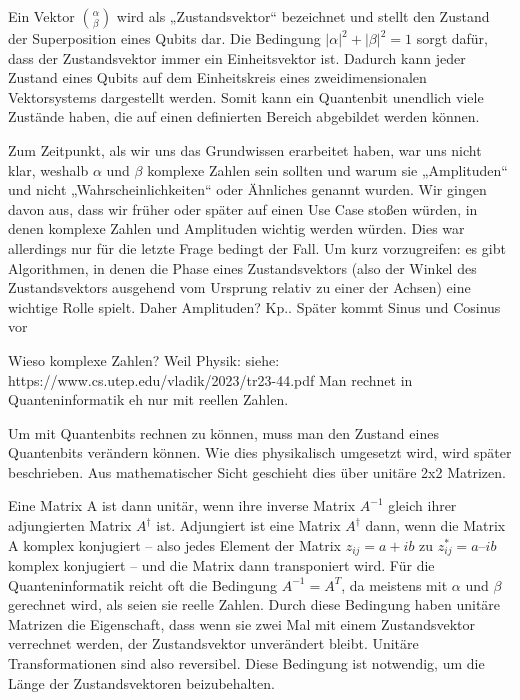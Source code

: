 Ein Vektor $\binom{\alpha}{\beta}$ wird als „Zustandsvektor“ bezeichnet und stellt den Zustand der Superposition eines Qubits dar. Die Bedingung $\left|\alpha\right|^2+\left|\beta\right|^2=1$ sorgt dafür, dass der Zustandsvektor immer ein Einheitsvektor ist. Dadurch kann jeder Zustand eines Qubits auf dem Einheitskreis eines zweidimensionalen Vektorsystems dargestellt werden. Somit kann ein Quantenbit unendlich viele Zustände haben, die auf einen definierten Bereich abgebildet werden können. 

\begin{tcolorbox}[title=Kommentar,
    title filled=false,
    colback=cyan!5!white,
    colframe=cyan!75!black]
Zum Zeitpunkt, als wir uns das Grundwissen erarbeitet haben, war uns nicht klar, weshalb $\alpha$ und $\beta$ komplexe Zahlen sein sollten und warum sie „Amplituden“ und nicht „Wahrscheinlichkeiten“ oder Ähnliches genannt wurden. Wir gingen davon aus, dass wir früher oder später auf einen Use Case stoßen würden, in denen komplexe Zahlen und Amplituden wichtig werden würden. Dies war allerdings nur für die letzte Frage bedingt der Fall. Um kurz vorzugreifen: es gibt Algorithmen, in denen die Phase eines Zustandsvektors (also der Winkel des Zustandsvektors ausgehend vom Ursprung relativ zu einer der Achsen) eine wichtige Rolle spielt. Daher Amplituden? Kp.. Später kommt Sinus und Cosinus vor   

Wieso komplexe Zahlen? Weil Physik: siehe: https://www.cs.utep.edu/vladik/2023/tr23-44.pdf Man rechnet in Quanteninformatik eh nur mit reellen Zahlen.
\end{tcolorbox}

Um mit Quantenbits rechnen zu können, muss man den Zustand eines Quantenbits verändern können. Wie dies physikalisch umgesetzt wird, wird später beschrieben. Aus mathematischer Sicht geschieht dies über unitäre 2x2 Matrizen. 

Eine Matrix A ist dann unitär, wenn ihre inverse Matrix $A^{-1}$ gleich ihrer adjungierten Matrix $A^\dag$ ist. Adjungiert ist eine Matrix $A^\dag$ dann, wenn die Matrix A komplex konjugiert – also jedes Element der Matrix $z_{ij}=a+ib$ zu $z_{ij}^\ast=a–ib$ komplex konjugiert – und die Matrix dann transponiert wird. Für die Quanteninformatik reicht oft die Bedingung $A^{-1}=A^T$, da meistens mit $\alpha$ und $\beta$ gerechnet wird, als seien sie reelle Zahlen. Durch diese Bedingung haben unitäre Matrizen die Eigenschaft, dass wenn sie zwei Mal mit einem Zustandsvektor verrechnet werden, der Zustandsvektor unverändert bleibt. Unitäre Transformationen sind also reversibel. Diese Bedingung ist notwendig, um die Länge der Zustandsvektoren beizubehalten.

